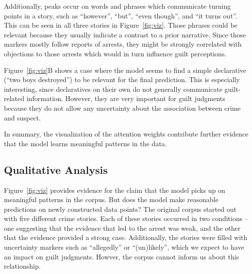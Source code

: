 \documentclass[11pt,a4paper]{article}
\begin{document}
Additionally, peaks occur on words and phrases which communicate turning points in a story, such as ``however'', ``but'', ``even though'', and ``it turns out''. This can be seen in all three stories in Figure~\ref{fig:viz}. Those phrases could be relevant because they usually indicate a contrast to a prior narrative. Since those markers mostly follow reports of arrests, they might be strongly correlated with objections to those arrests which would in turn influence guilt perceptions.

Figure~\ref{fig:viz}B shows a case where the model seems to find a simple declarative (``two boys destroyed'') to be relevant for the final prediction. This is especially interesting, since declaratives on their own do not generally communicate guilt-related information. However, they are very important for guilt judgments because they do not allow any uncertainty about the association between crime and suspect.

In summary, the visualization of the attention weights contribute further evidence that the model learns meaningful patterns in the data.


\subsection{Qualitative Analysis}

Figure~\ref{fig:viz} provides evidence for the claim that the model picks up on meaningful patterns in the corpus. But does the model make reasonable predictions on newly constructed data points?  The original corpus started out with five different crime stories. Each of these stories occurred in two conditions -- one suggesting that the evidence that led to the arrest was weak, and the other that the evidence provided a strong case. Additionally, the stories were filled with uncertainty markers such as ``allegedly'' or ``(un)likely'', which we expect to have an impact on guilt judgments. Howver, the corpus cannot inform us about this relationship.
\end{document}
